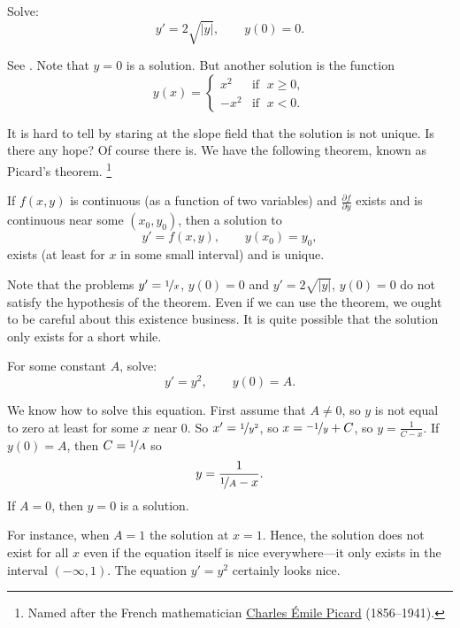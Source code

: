 \begin{example}
Solve:
\begin{equation*}
y' = 2 \sqrt{\lvert y \rvert}, \qquad y(0) = 0 .
\end{equation*}

See .
Note that $y=0$ is a solution.  But another solution is the function
\begin{equation*}
y(x) =
\begin{cases}
x^2 & \text{if } \; x \geq 0,\\
-x^2 & \text{if } \; x < 0.
\end{cases}
\end{equation*}
\end{example}

It is hard to tell by staring at the slope field that the
solution is not
unique.
Is there any hope?
Of course there is.  We have the following theorem,
known as Picard's theorem.%
\footnote{Named after the French mathematician
\href{https://en.wikipedia.org/wiki/Charles_\%C3\%89mile_Picard}{Charles \'Emile Picard}
(1856--1941).}

\begin{theorem}%
\label{slope:picardthm}%
If $f(x,y)$ is continuous (as a function of two
variables) and $\frac{\partial f}{\partial y}$ exists and is
continuous near some $(x_0,y_0)$, then a solution to
\begin{equation*}
y' = f(x,y), \qquad y(x_0) = y_0,
\end{equation*}
exists (at least for $x$ in some small interval) and is unique.
\end{theorem}

Note that the problems $y' = \nicefrac{1}{x}$, $y(0) = 0$ and
$y' = 2 \sqrt{\lvert y \rvert}$, $y(0) = 0$ do not satisfy the hypothesis of the
theorem.
Even if we can use the theorem,
we ought to be careful about this existence business.  It is quite
possible that the solution only exists for a short while.

\begin{example}
For some constant $A$, solve:
\begin{equation*}
y' = y^2, \qquad y(0) = A .
\end{equation*}

We know how to solve this equation.  First assume that $A \neq 0$,
so $y$ is not equal to zero at least for some $x$ near 0.  So
$x' = \nicefrac{1}{y^2}$, so
$x = \nicefrac{-1}{y} + C$, so $y = \frac{1}{C-x}$.  If $y(0) = A$, then
$C = \nicefrac{1}{A}$ so
\begin{equation*}
y = \frac{1}{\nicefrac{1}{A} - x} .
\end{equation*}
If $A=0$, then $y=0$ is a solution.

For instance, when $A=1$
the solution  at $x=1$.  Hence, the solution does not exist
for all $x$ even if the equation itself is nice everywhere---it only exists
in the interval $(-\infty,1)$.  The equation
$y' = y^2$ certainly
looks nice.
\end{example}

